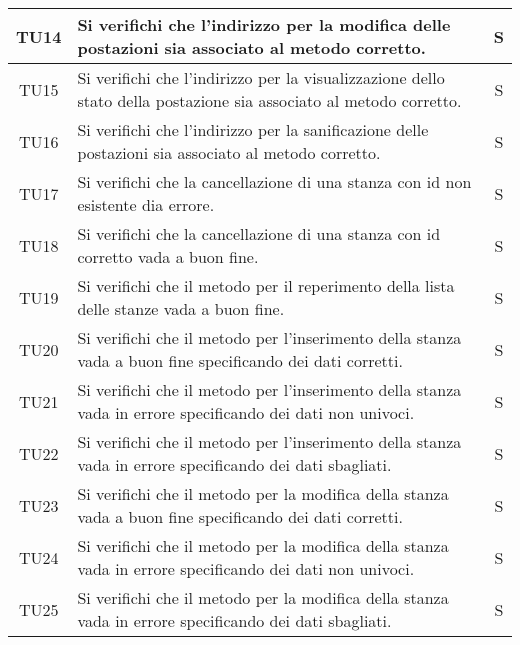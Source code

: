 \begin{center}
\begin{longtable}{|c|p{10cm}|c|}
			\hline
			TU14 & Si verifichi che l'indirizzo per la modifica delle postazioni sia associato al metodo corretto. & S \\	
			\hline
			TU15 & Si verifichi che l'indirizzo per la visualizzazione dello stato della postazione sia associato al metodo corretto. & S \\	
			\hline
			TU16 & Si verifichi che l'indirizzo per la sanificazione delle postazioni sia associato al metodo corretto. & S \\	
			\hline
			TU17 & Si verifichi che la cancellazione di una stanza con id non esistente dia errore. & S \\	
			\hline
			TU18 & Si verifichi che la cancellazione di una stanza con id corretto vada a buon fine. & S \\	
			\hline
			TU19 & Si verifichi che il metodo per il reperimento della lista delle stanze vada a buon fine. & S \\	
			\hline
			TU20 & Si verifichi che il metodo per l'inserimento della  stanza vada a buon fine specificando dei dati corretti. & S \\	
			\hline
			TU21 & Si verifichi che il metodo per l'inserimento della  stanza vada in errore specificando dei dati non univoci. & S \\	
			\hline
			TU22 & Si verifichi che il metodo per l'inserimento della  stanza vada in errore specificando dei dati sbagliati. & S \\	
			\hline
			TU23 & Si verifichi che il metodo per la modifica della  stanza vada a buon fine specificando dei dati corretti. & S \\	
			\hline
			TU24 & Si verifichi che il metodo per la modifica della  stanza vada in errore specificando dei dati non univoci. & S \\	
			\hline
			TU25 & Si verifichi che il metodo per la modifica della  stanza vada in errore specificando dei dati sbagliati. & S \\	
			\hline
			

\end{longtable}
\end{center}
